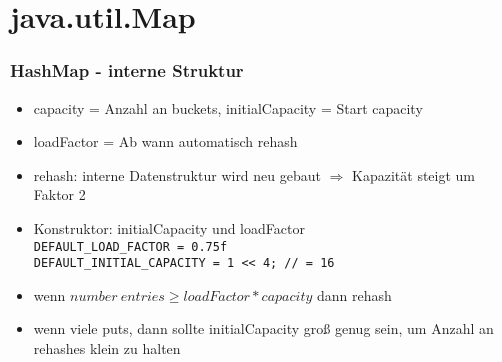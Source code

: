 \section{java.util.Map}




\begin{frame}[fragile]
\frametitle{HashMap - interne Struktur}
\begin{itemize}[<+->]
  \item capacity = Anzahl an buckets, initialCapacity = Start capacity
  \item loadFactor = Ab wann automatisch rehash
  \item rehash: interne Datenstruktur wird neu gebaut $\Rightarrow$ Kapazität steigt um Faktor 2
  \item Konstruktor: initialCapacity und loadFactor \\
	\verb+DEFAULT_LOAD_FACTOR = 0.75f+ \\
	\verb+DEFAULT_INITIAL_CAPACITY = 1 << 4; // = 16+
  \item wenn $number\ entries \geq loadFactor * capacity$ dann rehash
  \item wenn viele puts, dann sollte initialCapacity groß genug sein, um Anzahl an rehashes klein zu halten
\end{itemize}
\end{frame}


